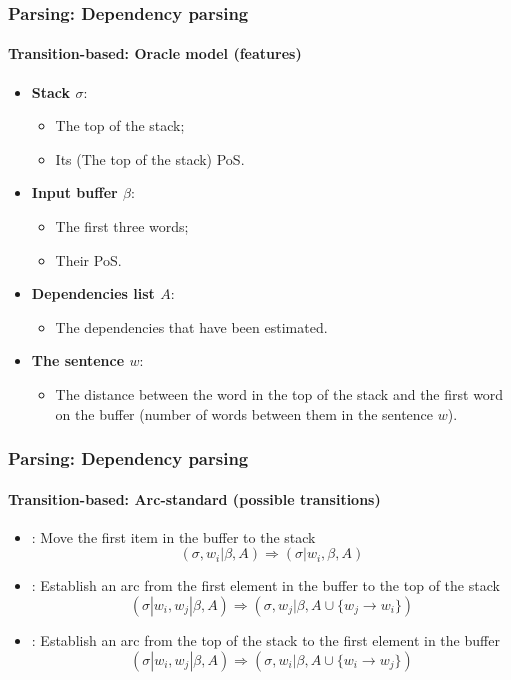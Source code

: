 \documentclass[xcolor=table]{beamer}
\begin{document}
\begin{frame}
\frametitle{Parsing: Dependency parsing}
\framesubtitle{Transition-based: Oracle model (features)}

\begin{itemize}
	\item \textbf{Stack $\sigma$}:
	\begin{itemize}
		\item The top of the stack;
		\item Its (The top of the stack) PoS.
	\end{itemize}

	\item \textbf{Input buffer $\beta$}:
	\begin{itemize}
		\item The first three words;
		\item Their PoS.
	\end{itemize}

	\item \textbf{Dependencies list $A$}:
	\begin{itemize}
		\item The dependencies that have been estimated.
	\end{itemize}

	\item \textbf{The sentence $w$}:
	\begin{itemize}
		\item The distance between the word in the top of the stack and the first word on the buffer (number of words between them in the sentence $w$).
	\end{itemize}

\end{itemize}

\end{frame}

\begin{frame}
\frametitle{Parsing: Dependency parsing}
\framesubtitle{Transition-based: Arc-standard (possible transitions)}

\begin{itemize}
	\item {}: Move the first item in the buffer to the stack
	\[ (\sigma, w_i|\beta, A) \Rightarrow  (\sigma|w_i, \beta, A) \]
	
	\item {}: Establish an arc from the first element in the buffer to the top of the stack
	\[ (\sigma|w_i, w_j|\beta, A) \Rightarrow  (\sigma, w_j|\beta, A \cup \{w_j \rightarrow w_i \}) \] 
	
	\item {}: Establish an arc from the top of the stack to the first element in the buffer
	\[ (\sigma|w_i, w_j|\beta, A) \Rightarrow  (\sigma, w_i|\beta, A \cup \{w_i \rightarrow w_j \}) \] 
\end{itemize}

\end{frame}
\end{document}
